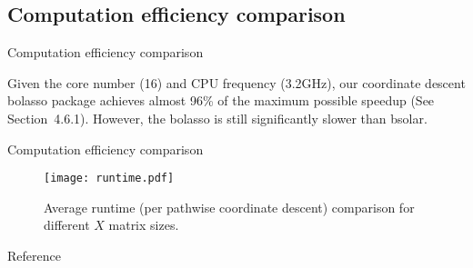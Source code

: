 \documentclass{beamer}
\begin{document}
\subsection{Computation efficiency comparison}

\begin{frame}{Computation efficiency comparison}

  Given the core number (16) and CPU frequency (3.2GHz), our coordinate descent bolasso package achieves almost 96\% of the maximum possible speedup (See Section~4.6.1). However, the bolasso is still significantly slower than bsolar.

  \begin{table}[H]
    \centering
    \caption{Simulation results for parallel computation time (mean runtime in seconds).\label{table:sim_load}}
    \smallskip
  \end{table}

\end{frame}

\begin{frame}{Computation efficiency comparison}
  \begin{figure}[ht]
    \centering
    \texttt{[image: runtime.pdf]}
    \caption{Average runtime (per pathwise coordinate descent) comparison for different $X$ matrix sizes.}
    \label{fig:runtime}
  \end{figure}
\end{frame}

\begin{frame}{Reference}
  
  
\end{frame}
\end{document}
